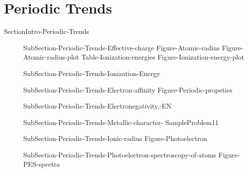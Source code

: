 \documentclass[main.tex]{subfiles}
\begin{document}
\section{Periodic Trends}{SectionIntro-Periodic-Trends}
\sloppy
\begin{description}
\item[] {SubSection-Periodic-Trends-Effective-charge}
   {Figure-Atomic-radius}
{Figure-Atomic-radius-plot}
{Table-Ionization-energies}\newpage
{Figure-Ionization-energy-plot}
\item[] {SubSection-Periodic-Trends-Ionization-Energy}
\item[] {SubSection-Periodic-Trends-Electron-affinity}
  {Figure-Periodic-propeties}
\newpage
\item[] {SubSection-Periodic-Trends-Electronegativity,-EN}
\item[]{SubSection-Periodic-Trends-Metallic-character-}
  {SampleProblem11}
\item[]  {SubSection-Periodic-Trends-Ionic-radius}
{Figure-Photoelectron}
\item[] {SubSection-Periodic-Trends-Photoelectron-spectroscopy-of-atoms}
{Figure-PES-spectra}
\end{description}


\newpage
\end{document}
